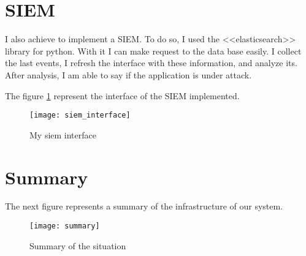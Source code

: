 \section{SIEM}
\label{sec:SIEM}

I also achieve to implement a SIEM. To do so, I used the <<elasticsearch>> library for python. With it I can make
request to the data base easily. I collect the last events, I refresh the interface with these information, and
analyze its. After analysis, I am able to say if the application is under attack.

The figure \ref{fig:mysiem} represent the interface of the SIEM implemented.


\begin{figure}[h]
  \centering
  \texttt{[image: siem\_interface]}
  \caption{My siem interface}
  \label{fig:mysiem}
\end{figure}

\newpage
\section{Summary}

The next figure represents a summary of the infrastructure of our system.

\begin{figure}[h]
  \centering
  \texttt{[image: summary]}
  \caption{Summary of the situation}
  \label{fig:summ}
\end{figure}

